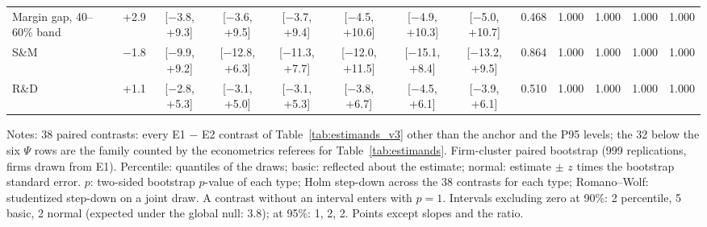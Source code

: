 \begin{table}[t]
{\begin{tabular}{llcccccccccccc}
Margin gap, 40--60\% band &  & +2.9 & [$-$3.8, +9.3] & [$-$3.6, +9.5] & [$-$3.7, +9.4] & [$-$4.5, +10.6] & [$-$4.9, +10.3] & [$-$5.0, +10.7] & 0.468 & 1.000 & 1.000 & 1.000 & 1.000 \\
\quad S\&M &  & $-$1.8 & [$-$9.9, +9.2] & [$-$12.8, +6.3] & [$-$11.3, +7.7] & [$-$12.0, +11.5] & [$-$15.1, +8.4] & [$-$13.2, +9.5] & 0.864 & 1.000 & 1.000 & 1.000 & 1.000 \\
\quad R\&D &  & +1.1 & [$-$2.8, +5.3] & [$-$3.1, +5.0] & [$-$3.1, +5.3] & [$-$3.8, +6.7] & [$-$4.5, +6.1] & [$-$3.9, +6.1] & 0.510 & 1.000 & 1.000 & 1.000 & 1.000 \\
\bottomrule\end{tabular}}
\par\vspace{2pt}\footnotesize\raggedright Notes: 38 paired contrasts: every E1 $-$ E2 contrast of Table~\ref{tab:estimands_v3} other than the anchor and the P95 levels; the 32 below the six $\Psi$ rows are the family counted by the econometrics referees for Table~\ref{tab:estimands}. Firm-cluster paired bootstrap (999 replications, firms drawn from E1). Percentile: quantiles of the draws; basic: reflected about the estimate; normal: estimate $\pm$ $z$ times the bootstrap standard error. $p$: two-sided bootstrap $p$-value of each type; Holm step-down across the 38 contrasts for each type; Romano--Wolf: studentized step-down on a joint draw. A contrast without an interval enters with $p=1$. Intervals excluding zero at 90\%: 2 percentile, 5 basic, 2 normal (expected under the global null: 3.8); at 95\%: 1, 2, 2. Points except slopes and the ratio.
\end{table}